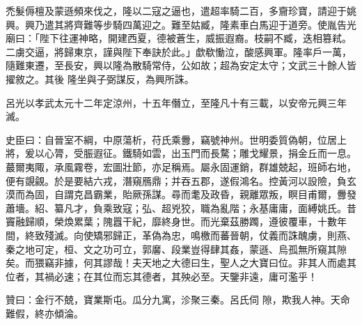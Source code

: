\begin{pinyinscope}
 禿髮傉檀及蒙遜頻來伐之，隆以二寇之逼也，遣超率騎二百，多齎珍寶，請迎于姚興。興乃遣其將齊難等步騎四萬迎之。難至姑臧，隆素車白馬迎于道旁。使胤告光廟曰：「陛下往運神略，開建西夏，德被蒼生，威振遐裔。枝嗣不臧，迭相篡弒。二虜交逼，將歸東京，謹與陛下奉訣於此。」歔欷慟泣，酸感興軍。隆率戶一萬，隨難東遷，至長安，興以隆為散騎常侍，公如故；超為安定太守；文武三十餘人皆擢敘之。其後
 隆坐與子弼謀反，為興所誅。



 呂光以孝武太元十二年定涼州，十五年僭立，至隆凡十有三載，以安帝元興三年滅。



 史臣曰：自晉室不綱，中原蕩析，苻氏乘釁，竊號神州。世明委質偽朝，位居上將，爰以心膂，受脤遐征。鐵騎如雲，出玉門而長騖；雕戈耀景，捐金丘而一息。蕞爾夷陬，承風霧卷，宏圖壯節，亦足稱焉。屬永固運銷，群雄兢起，班師右地，便有覬覦。於是要結六戎，潛窺鴈鼎；并吞五郡，遂假鴻名。控黃河以設險，負玄漠而為固，自謂克昌霸業，貽厥孫謀。尋而耄及政昏，親離眾叛，瞑目甫爾，釁發
 蕭墻。紹、纂凡才，負乘致寇；弘、超兇狡，職為亂階；永基庸庸，面縛姚氏。昔竇融歸順，榮煥累葉；隗囂干紀，靡終身世。而光棄茲勝躅，遵彼覆車，十數年間，終致殘滅。向使矯邪歸正，革偽為忠，鳴檄而蕃晉朝，仗義而誅醜虜，則燕、秦之地可定，桓、文之功可立，郭黁、段業豈得肆其姦，蒙遜、烏孤無所窺其隙矣。而猥竊非據，何其謬哉！夫天地之大德曰生，聖人之大寶曰位。非其人而處其位者，其禍必速；在其位而忘其德者，其殃必至。天鑒非遠，庸可濫乎！



 贊曰：金行不兢，寶業斯屯。瓜分九寓，沴聚三秦。呂氏伺
 隙，欺我人神。天命難假，終亦傾淪。



\end{pinyinscope}
